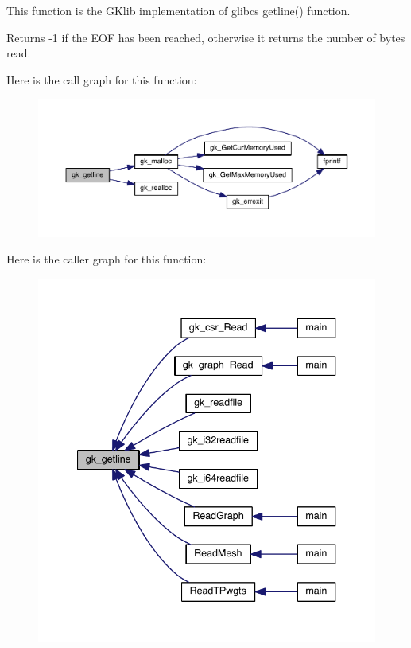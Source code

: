 This function is the G\+Klib implementation of glibc\textquotesingle{}s getline() function. \begin{DoxyReturn}{Returns}
-\/1 if the E\+OF has been reached, otherwise it returns the number of bytes read. 
\end{DoxyReturn}
Here is the call graph for this function\+:\nopagebreak
\begin{figure}[H]
\begin{center}
\leavevmode
\includegraphics[width=350pt]{a00855_ad8263f64108434d7ebab9799b5ab9632_cgraph}
\end{center}
\end{figure}
Here is the caller graph for this function\+:\nopagebreak
\begin{figure}[H]
\begin{center}
\leavevmode
\includegraphics[width=340pt]{a00855_ad8263f64108434d7ebab9799b5ab9632_icgraph}
\end{center}
\end{figure}
\mbox{\label{a00855_a201c46a9a2bf9c06a917f259d109b7ee}} 
